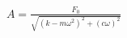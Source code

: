 \documentclass[preview]{standalone}
\begin{document}
\begin{align*}
A = \frac{F_0}{\sqrt{(k - m\omega^2)^2 + (c\omega)^2}}
\end{align*}
\end{document}
